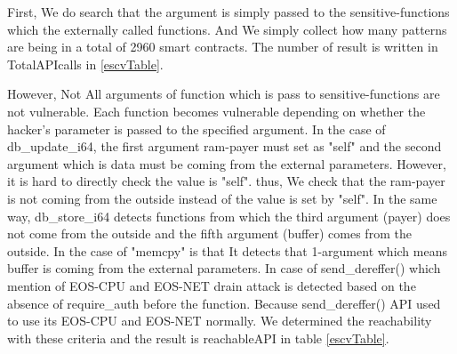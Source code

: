 First, We do search that the argument is simply passed to the sensitive-functions which the externally called functions. And We simply collect how many patterns are being in a total of 2960 smart contracts. The number of result is written in TotalAPIcalls in \autoref{escvTable}.

However, Not All arguments of function which is pass to sensitive-functions are not vulnerable. Each function becomes vulnerable depending on whether the hacker's parameter is passed to the specified argument. In the case of db\_update\_i64, the first argument ram-payer must set as "self" and the second argument which is data must be coming from the external parameters. However, it is hard to directly check the value is "self". thus, We check that the ram-payer is not coming from the outside instead of the value is set by "self".
In the same way, db\_store\_i64 detects functions from which the third argument (payer) does not come from the outside and the fifth argument (buffer) comes from the outside.
In the case of "memcpy" is that It detects that 1-argument which means buffer is coming from the external parameters.
In case of send\_dereffer() which mention of EOS-CPU and EOS-NET drain attack is detected based on the absence of require\_auth before the function. Because send\_dereffer() API used to use its EOS-CPU and EOS-NET normally.
We determined the reachability with these criteria and the result is reachableAPI in table \autoref{escvTable}.




